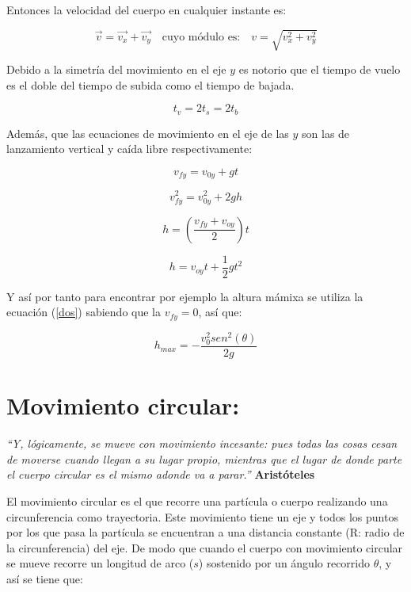 \documentclass[a5paper,pagesize,10pt,bibtotoc,pointlessnumbers,
normalheadings,DIV=9,fleqn,x11names,table,twoside=false]{scrbook}
\begin{document}
Entonces la velocidad del cuerpo en cualquier instante es:

\begin{equation}
 \vec{v} = \vec{v_x} + \vec{v_y}\quad \text{cuyo módulo es:} \quad v = \sqrt{v_x^2+v_y^2}
\end{equation}

Debido a la simetría del movimiento en el eje $y$ es notorio que el tiempo de vuelo es el doble del tiempo de subida como el 
tiempo de bajada.

\begin{equation}
 t_v = 2t_s =2t_b
\end{equation}

Además, que las ecuaciones de movimiento en el eje de las $y$ son las de lanzamiento vertical y caída libre respectivamente:

\begin{equation}
 v_{fy} = v_{0y} + gt
\end{equation}

\begin{equation}
 v_{fy}^2 = v_{0y}^2 + 2gh
\end{equation}\label{dos}

\begin{equation}
 h =(\frac{v_{fy}+v_{oy}}{2})t
\end{equation}

\begin{equation}
 h = v_{oy}t + \frac{1}{2}gt^2
\end{equation}

Y así por tanto para encontrar por ejemplo la altura mámixa se utiliza la ecuación (\ref{dos}) sabiendo que la $v_{fy} = 0$, así 
que:

\begin{equation}
 h_{max} = -\frac{v_0^2sen^2(\theta)}{2g}
\end{equation}

\chapter{Movimiento circular:}

\textit{``Y, lógicamente, se mueve con movimiento incesante: pues todas las cosas cesan de moverse cuando llegan a su lugar 
propio, mientras que el lugar de donde parte el cuerpo circular es el mismo adonde va a parar.''} \textbf{Aristóteles}
\vspace{1.0cm}

El movimiento circular es el que recorre una partícula o cuerpo realizando una circunferencia como trayectoria. Este movimiento 
tiene un eje y todos los puntos por los que pasa la partícula se encuentran a una distancia constante (R: radio de la 
circunferencia) del eje. De modo que cuando el cuerpo con movimiento circular se mueve recorre un longitud de arco ($s$) 
sostenido por un ángulo recorrido $\theta$, y así se tiene que:
\end{document}
